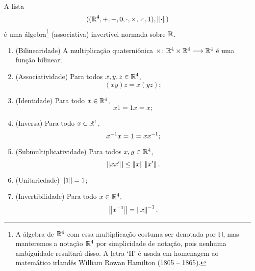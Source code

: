 \begin{proposition}
A lista
	\begin{equation*}
	((\R^4,+,-,0,\cdot,\times,\div,1),\nor{\var})
	\end{equation*}
é uma álgebra\footnote{A álgebra de $\mathbb{R}^4$ com essa multiplicação costuma ser denotada por $\mathbb{H}$, mas manteremos a notação $\mathbb{R}^4$ por simplicidade de notação, pois nenhuma ambiguidade resultará disso. A letra `H' é usada em homenagem ao matemático irlandês William Rowan Hamilton (1805 -- 1865).} (associativa) invertível normada sobre $\mathbb{R}$.
\begin{enumerate}
	\item (Bilinearidade) A multiplicação quaterniônica ${\times}\colon {\mathbb{R}^4 \times \mathbb{R}^4} \longrightarrow {\mathbb{R}^4}$ é uma função bilinear;
	\item (Associatividade) Para todos $x,y,z \in \mathbb{R}^4$,
		\begin{equation*}
		(xy)z = x(yz);
		\end{equation*}
	\item (Identidade) Para todo $x \in \mathbb{R}^4$,
		\begin{equation*}
		x1 = 1x = x;
		\end{equation*}
	\item (Inversa) Para todo $x \in \mathbb{R}^4$,
		\begin{equation*}
		x^{-1} x = 1 = xx^{-1};
		\end{equation*}
	\item (Submultiplicatividade) Para todos $x,y \in \mathbb{R}^4$,
		\begin{equation*}
		\left\Vert{xx'}\right\Vert \leq \left\Vert{x}\right\Vert\left\Vert{x'}\right\Vert.
		\end{equation*}
	\item (Unitariedade) $\left\Vert{1}\right\Vert=1$;
	\item (Invertibilidade) Para todo $x \in \mathbb{R}^4$,
		\begin{equation*}
		\left\Vert{x^{-1}}\right\Vert = \left\Vert{x}\right\Vert^{-1}.
		\end{equation*}
\end{enumerate}
\end{proposition}
\begingroup
\allowdisplaybreaks
